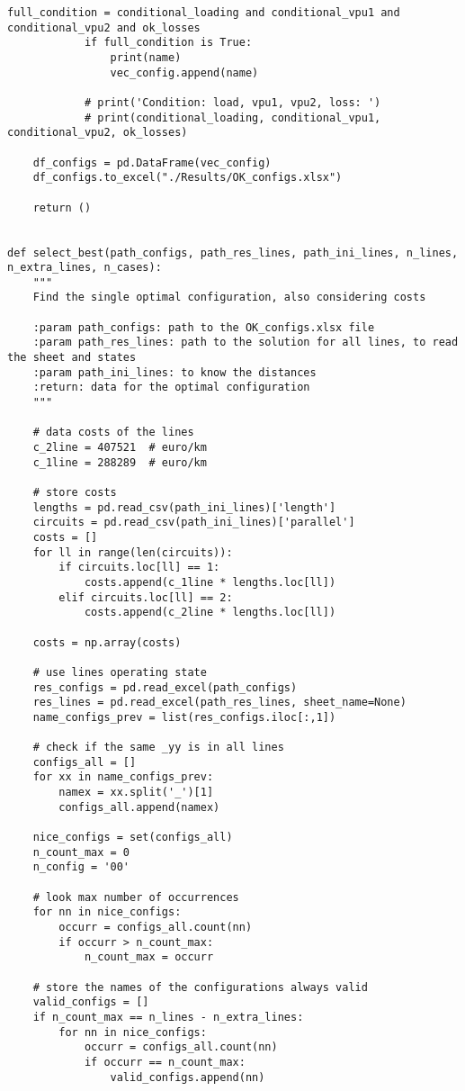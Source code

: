 \begin{lstlisting}[caption={Main code in Python with the Pandapower library}]
            full_condition = conditional_loading and conditional_vpu1 and conditional_vpu2 and ok_losses
            if full_condition is True:
                print(name)
                vec_config.append(name)

            # print('Condition: load, vpu1, vpu2, loss: ')
            # print(conditional_loading, conditional_vpu1, conditional_vpu2, ok_losses)

    df_configs = pd.DataFrame(vec_config)
    df_configs.to_excel("./Results/OK_configs.xlsx")

    return ()


def select_best(path_configs, path_res_lines, path_ini_lines, n_lines, n_extra_lines, n_cases):
    """
    Find the single optimal configuration, also considering costs

    :param path_configs: path to the OK_configs.xlsx file
    :param path_res_lines: path to the solution for all lines, to read the sheet and states
    :param path_ini_lines: to know the distances
    :return: data for the optimal configuration
    """

    # data costs of the lines
    c_2line = 407521  # euro/km
    c_1line = 288289  # euro/km

    # store costs
    lengths = pd.read_csv(path_ini_lines)['length']
    circuits = pd.read_csv(path_ini_lines)['parallel']
    costs = []
    for ll in range(len(circuits)):
        if circuits.loc[ll] == 1:
            costs.append(c_1line * lengths.loc[ll])
        elif circuits.loc[ll] == 2:
            costs.append(c_2line * lengths.loc[ll])

    costs = np.array(costs)

    # use lines operating state
    res_configs = pd.read_excel(path_configs)
    res_lines = pd.read_excel(path_res_lines, sheet_name=None)
    name_configs_prev = list(res_configs.iloc[:,1])

    # check if the same _yy is in all lines
    configs_all = []
    for xx in name_configs_prev:
        namex = xx.split('_')[1]
        configs_all.append(namex)

    nice_configs = set(configs_all)
    n_count_max = 0
    n_config = '00'

    # look max number of occurrences
    for nn in nice_configs:
        occurr = configs_all.count(nn)
        if occurr > n_count_max:
            n_count_max = occurr

    # store the names of the configurations always valid
    valid_configs = []
    if n_count_max == n_lines - n_extra_lines:
        for nn in nice_configs:
            occurr = configs_all.count(nn)
            if occurr == n_count_max:
                valid_configs.append(nn)





\end{lstlisting}
